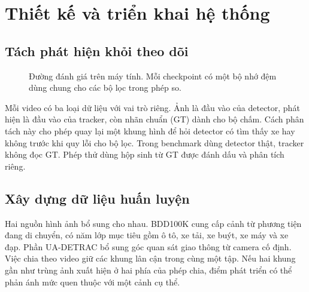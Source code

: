 \chapter{Thiết kế và triển khai hệ thống}
\section{Tách phát hiện khỏi theo dõi}
\begin{figure}[htbp]\centering
{}
\caption{Đường đánh giá trên máy tính. Mỗi checkpoint có một bộ nhớ đệm dùng chung cho các bộ lọc trong phép so.}
\end{figure}
Mỗi video có ba loại dữ liệu với vai trò riêng. Ảnh là đầu vào của detector, phát hiện là đầu vào của tracker, còn nhãn chuẩn (GT) dành cho bộ chấm. Cách phân tách này cho phép quay lại một khung hình để hỏi detector có tìm thấy xe hay không trước khi quy lỗi cho bộ lọc. Trong benchmark dùng detector thật, tracker không đọc GT. Phép thử dùng hộp sinh từ GT được đánh dấu và phân tích riêng.

\section{Xây dựng dữ liệu huấn luyện}
Hai nguồn hình ảnh bổ sung cho nhau. BDD100K cung cấp cảnh từ phương tiện đang di chuyển, có năm lớp mục tiêu gồm ô tô, xe tải, xe buýt, xe máy và xe đạp. Phần UA-DETRAC bổ sung góc quan sát giao thông từ camera cố định. Việc chia theo video giữ các khung lân cận trong cùng một tập. Nếu hai khung gần như trùng ảnh xuất hiện ở hai phía của phép chia, điểm phát triển có thể phản ánh mức quen thuộc với một cảnh cụ thể.

